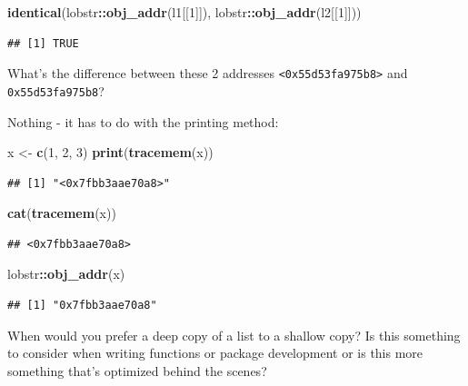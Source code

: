 \documentclass[]{book}
\newenvironment{Shaded}{\begin{snugshade}}{\end{snugshade}}
\newcommand{\DecValTok}[1]{\textcolor[rgb]{0.00,0.00,0.81}{#1}}
\newcommand{\KeywordTok}[1]{\textcolor[rgb]{0.13,0.29,0.53}{\textbf{#1}}}
\newcommand{\NormalTok}[1]{#1}
\newcommand{\OperatorTok}[1]{\textcolor[rgb]{0.81,0.36,0.00}{\textbf{#1}}}
\newcommand{\StringTok}[1]{\textcolor[rgb]{0.31,0.60,0.02}{#1}}
\begin{document}
\begin{Shaded}
\begin{Highlighting}[]
\KeywordTok{identical}\NormalTok{(lobstr}\OperatorTok{::}\KeywordTok{obj_addr}\NormalTok{(l1[[}\DecValTok{1}\NormalTok{]]), lobstr}\OperatorTok{::}\KeywordTok{obj_addr}\NormalTok{(l2[[}\DecValTok{1}\NormalTok{]]))}
\end{Highlighting}
\end{Shaded}

\begin{verbatim}
## [1] TRUE
\end{verbatim}

What's the difference between these 2 addresses \texttt{\textless{}0x55d53fa975b8\textgreater{}} and \texttt{0x55d53fa975b8}?

Nothing - it has to do with the printing method:

\begin{Shaded}
\begin{Highlighting}[]
\NormalTok{x <-}\StringTok{ }\KeywordTok{c}\NormalTok{(}\DecValTok{1}\NormalTok{, }\DecValTok{2}\NormalTok{, }\DecValTok{3}\NormalTok{)}
\KeywordTok{print}\NormalTok{(}\KeywordTok{tracemem}\NormalTok{(x))}
\end{Highlighting}
\end{Shaded}

\begin{verbatim}
## [1] "<0x7fbb3aae70a8>"
\end{verbatim}

\begin{Shaded}
\begin{Highlighting}[]
\KeywordTok{cat}\NormalTok{(}\KeywordTok{tracemem}\NormalTok{(x))}
\end{Highlighting}
\end{Shaded}

\begin{verbatim}
## <0x7fbb3aae70a8>
\end{verbatim}

\begin{Shaded}
\begin{Highlighting}[]
\NormalTok{lobstr}\OperatorTok{::}\KeywordTok{obj_addr}\NormalTok{(x)}
\end{Highlighting}
\end{Shaded}

\begin{verbatim}
## [1] "0x7fbb3aae70a8"
\end{verbatim}

When would you prefer a deep copy of a list to a shallow copy? Is this something to consider when writing functions or package development or is this more something that's optimized behind the scenes?
\end{document}
